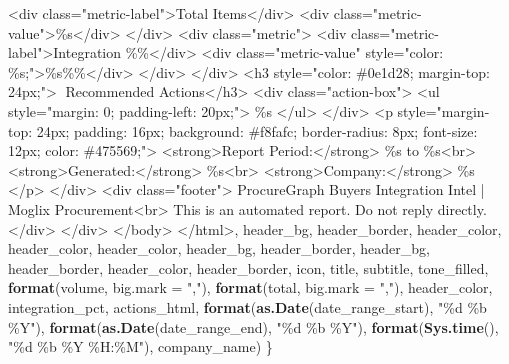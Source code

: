 \documentclass[
]{article}
\newenvironment{Shaded}{\begin{snugshade}}{\end{snugshade}}
\newcommand{\AttributeTok}[1]{\textcolor[rgb]{0.13,0.29,0.53}{#1}}
\newcommand{\FunctionTok}[1]{\textcolor[rgb]{0.13,0.29,0.53}{\textbf{#1}}}
\newcommand{\NormalTok}[1]{#1}
\newcommand{\StringTok}[1]{\textcolor[rgb]{0.31,0.60,0.02}{#1}}
\begin{document}
\begin{Shaded}
\begin{Highlighting}[]
\StringTok{          \textless{}div class="metric{-}label"\textgreater{}Total Items\textless{}/div\textgreater{}}
\StringTok{          \textless{}div class="metric{-}value"\textgreater{}\%s\textless{}/div\textgreater{}}
\StringTok{        \textless{}/div\textgreater{}}
\StringTok{        \textless{}div class="metric"\textgreater{}}
\StringTok{          \textless{}div class="metric{-}label"\textgreater{}Integration \%\%\textless{}/div\textgreater{}}
\StringTok{          \textless{}div class="metric{-}value" style="color: \%s;"\textgreater{}\%s\%\%\textless{}/div\textgreater{}}
\StringTok{        \textless{}/div\textgreater{}}
\StringTok{      \textless{}/div\textgreater{}}
\StringTok{      \textless{}h3 style="color: \#0e1d28; margin{-}top: 24px;"\textgreater{}🎯 Recommended Actions\textless{}/h3\textgreater{}}
\StringTok{      \textless{}div class="action{-}box"\textgreater{}}
\StringTok{        \textless{}ul style="margin: 0; padding{-}left: 20px;"\textgreater{}}
\StringTok{          \%s}
\StringTok{        \textless{}/ul\textgreater{}}
\StringTok{      \textless{}/div\textgreater{}}
\StringTok{      \textless{}p style="margin{-}top: 24px; padding: 16px; background: \#f8fafc; border{-}radius: 8px; font{-}size: 12px; color: \#475569;"\textgreater{}}
\StringTok{        \textless{}strong\textgreater{}Report Period:\textless{}/strong\textgreater{} \%s to \%s\textless{}br\textgreater{}}
\StringTok{        \textless{}strong\textgreater{}Generated:\textless{}/strong\textgreater{} \%s\textless{}br\textgreater{}}
\StringTok{        \textless{}strong\textgreater{}Company:\textless{}/strong\textgreater{} \%s}
\StringTok{      \textless{}/p\textgreater{}}
\StringTok{    \textless{}/div\textgreater{}}
\StringTok{    \textless{}div class="footer"\textgreater{}}
\StringTok{      ProcureGraph Buyers Integration Intel | Moglix Procurement\textless{}br\textgreater{}}
\StringTok{      This is an automated report. Do not reply directly.}
\StringTok{    \textless{}/div\textgreater{}}
\StringTok{  \textless{}/div\textgreater{}}
\StringTok{\textless{}/body\textgreater{}}
\StringTok{\textless{}/html\textgreater{}\textquotesingle{}}\NormalTok{,}
\NormalTok{              header\_bg, header\_border, header\_color, header\_color,}
\NormalTok{              header\_color, header\_bg, header\_border, header\_bg, header\_border, header\_color,}
\NormalTok{              header\_border, icon, title, subtitle, tone\_filled,}
              \FunctionTok{format}\NormalTok{(volume, }\AttributeTok{big.mark =} \StringTok{","}\NormalTok{), }\FunctionTok{format}\NormalTok{(total, }\AttributeTok{big.mark =} \StringTok{","}\NormalTok{), header\_color, integration\_pct,}
\NormalTok{              actions\_html,}
              \FunctionTok{format}\NormalTok{(}\FunctionTok{as.Date}\NormalTok{(date\_range\_start), }\StringTok{"\%d \%b \%Y"}\NormalTok{), }\FunctionTok{format}\NormalTok{(}\FunctionTok{as.Date}\NormalTok{(date\_range\_end), }\StringTok{"\%d \%b \%Y"}\NormalTok{),}
              \FunctionTok{format}\NormalTok{(}\FunctionTok{Sys.time}\NormalTok{(), }\StringTok{"\%d \%b \%Y \%H:\%M"}\NormalTok{), company\_name)}
\NormalTok{    \}}
    

\end{Highlighting}
\end{Shaded}
\end{document}
